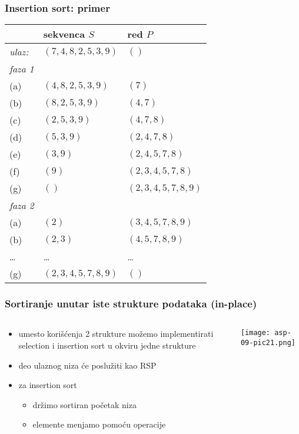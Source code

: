 \documentclass[compress]{beamer}
\begin{document}
\begin{frame}
  \frametitle{Insertion sort: primer}
  \begin{center}
    \begin{tabular}{lll}
       & \textbf{sekvenca $S$} & \textbf{red $P$} \\ \hline\hline
      \textit{ulaz:} & $(7,4,8,2,5,3,9)$ & $()$ \\ \hline
      \textit{faza 1} &  &   \\ 
      (a) & $(4,8,2,5,3,9)$ & $(7)$ \\ 
      (b) & $(8,2,5,3,9)$ & $(4,7)$ \\ 
      (c) & $(2,5,3,9)$ & $(4,7,8)$ \\ 
      (d) & $(5,3,9)$ & $(2,4,7,8)$ \\ 
      (e) & $(3,9)$ & $(2,4,5,7,8)$ \\ 
      (f) & $(9)$ & $(2,3,4,5,7,8)$ \\ 
      (g) & $()$ & $(2,3,4,5,7,8,9)$ \\ \hline 
      \textit{faza 2} &  &   \\ 
      (a) & $(2)$ & $(3,4,5,7,8,9)$ \\
      (b) & $(2,3)$ & $(4,5,7,8,9)$ \\
      \ldots & \ldots & \ldots \\ 
      (g) & $(2,3,4,5,7,8,9)$ & $()$
    \end{tabular}
  \end{center}
\end{frame}

\begin{frame}[fragile]
  \frametitle{Sortiranje unutar iste strukture podataka (in-place)}
  \begin{columns}
    \begin{column}[c]{6cm}
      \begin{itemize}
        \item umesto korišćenja 2 strukture možemo implementirati selection i insertion sort u okviru jedne strukture
        \item deo ulaznog niza će poslužiti kao RSP
        \item za insertion sort
        \begin{itemize}
          \item držimo sortiran početak niza
          \item elemente menjamo pomoću  operacije
        \end{itemize}
      \end{itemize}
    \end{column}
    \begin{column}[c]{5cm}
      \begin{center}
        \texttt{[image: asp-09-pic21.png]}
      \end{center}
    \end{column}
  \end{columns}
\end{frame}
\end{document}
